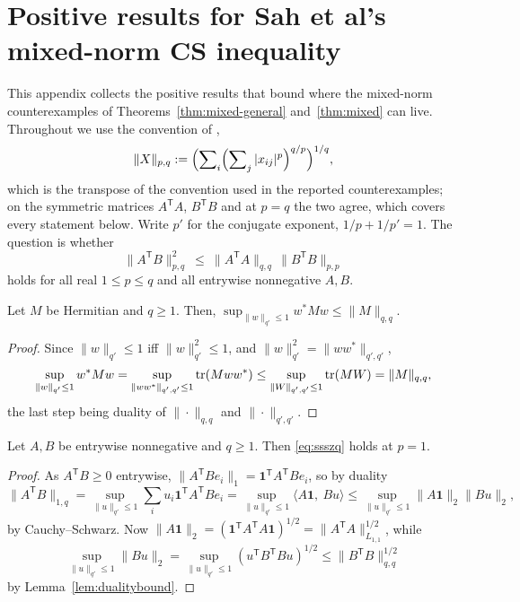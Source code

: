 \section{Positive results for Sah et al's mixed-norm CS inequality}
\label{sec:proofdetails}

This appendix collects the positive results that bound where the mixed-norm
counterexamples of Theorems~\ref{thm:mixed-general} and~\ref{thm:mixed} can live.  
Throughout we use the convention of \citet{SahSawhneyStonerZhao2020},
\[
\|X\|_{{p,q}}:=\Bigl(\sum\nolimits_i\Bigl(\sum\nolimits_j|x_{ij}|^p\Bigr)^{q/p}\Bigr)^{1/q},
\]
which is the transpose of the convention used in the reported counterexamples; on the
symmetric matrices $A^{\mathsf T}A$, $B^{\mathsf T}B$ and at $p=q$ the two agree,
which covers every statement below.  Write $p'$ for the conjugate exponent,
$1/p+1/p'=1$.  The question is whether
\begin{equation}\label{eq:ssszq}
\|A^{\mathsf T}B\|_{{p,q}}^2\ \le\ \|A^{\mathsf T}A\|_{{q,q}}\,\|B^{\mathsf T}B\|_{{p,p}}
\end{equation}
holds for all real $1\le p\le q$ and all entrywise nonnegative $A,B$.

\begin{lemma}\label{lem:dualitybound}
Let $M$ be Hermitian and $q\ge1$.  Then, $\sup_{\|w\|_{q'}\le1}w^*Mw\le\|M\|_{{q,q}}$.
\end{lemma}
\begin{proof}
Since $\|w\|_{q'}\le1$ iff $\|w\|_{q'}^2\le1$, and $\|w\|_{q'}^2=\|ww^*\|_{{q',q'}}$,
\[
\sup_{\|w\|_{q'}\le1}w^*Mw=\sup_{\|ww^*\|_{{q',q'}}\le1}\operatorname{tr}(Mww^*)
\le\sup_{\|W\|_{{q',q'}}\le1}\operatorname{tr}(MW)=\|M\|_{{q,q}},
\]
the last step being duality of $\|\cdot\|_{{q,q}}$ and $\|\cdot\|_{{q',q'}}$.
\end{proof}

\begin{proposition}\label{prop:pone}
Let $A,B$ be entrywise nonnegative and $q\ge1$.  Then \eqref{eq:ssszq} holds at $p=1$.
\end{proposition}
\begin{proof}
As $A^{\mathsf T}B\ge0$ entrywise, $\|A^{\mathsf T}Be_i\|_1=\mathbf 1^{\mathsf T}A^{\mathsf T}Be_i$, so by duality
\[
\|A^{\mathsf T}B\|_{{1,q}}=\sup_{\|u\|_{q'}\le1}\sum_i u_i\mathbf 1^{\mathsf T}A^{\mathsf T}Be_i
=\sup_{\|u\|_{q'}\le1}\langle A\mathbf 1,\ Bu\rangle
\le\sup_{\|u\|_{q'}\le1}\|A\mathbf 1\|_2\|Bu\|_2 ,
\]
by Cauchy--Schwarz.  Now $\|A\mathbf 1\|_2=(\mathbf 1^{\mathsf T}A^{\mathsf T}A\mathbf 1)^{1/2}=\|A^{\mathsf T}A\|_{L_{1,1}}^{1/2}$, while
$$\sup_{\|u\|_{q'}\le1}\|Bu\|_2=\sup_{\|u\|_{q'}\le1}(u^{\mathsf T}B^{\mathsf T}Bu)^{1/2}\le\|B^{\mathsf T}B\|_{{q,q}}^{1/2}$$
by Lemma~\ref{lem:dualitybound}.
\end{proof}

